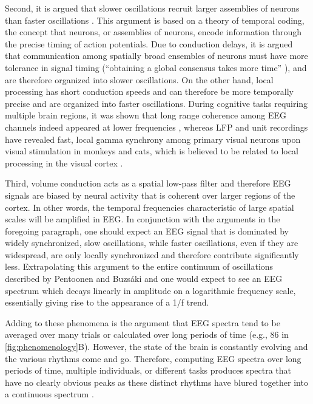 Second, it is argued that slower oscillations recruit larger assemblies of neurons than faster oscillations \cite{Buzsaki2006, Buzsaki2012c, Buzsaki2010}. This argument is based on a theory of temporal coding, the concept that neurons, or assemblies of neurons, encode information through the precise timing of action potentials. Due to conduction delays, it is argued that communication among spatially broad ensembles of neurons must have more tolerance in signal timing (``obtaining a global consensus takes more time'' \cite{Buzsaki2006}), and are therefore organized into slower oscillations. On the other hand, local processing has short conduction speeds and can therefore be more temporally precise and are organized into faster oscillations. During cognitive tasks requiring multiple brain regions, it was shown that long range coherence among EEG channels indeed appeared at lower frequencies \cite{Sarnthein1998,VonStein1999}, whereas LFP and unit recordings have revealed fast, local gamma synchrony among primary visual neurons upon visual stimulation in monkeys and cats, which is believed to be related to local processing in the visual cortex \cite{Gray1989,Eckhorn1994}.

Third, volume conduction acts as a spatial low-pass filter \cite{Nunez2006} and therefore EEG signals are biased by neural activity that is coherent over larger regions of the cortex. In other words, the temporal frequencies characteristic of large spatial scales will be amplified in EEG. In conjunction with the arguments in the foregoing paragraph, one should expect an EEG signal that is dominated by widely synchronized, slow oscillations, while faster oscillations, even if they are widespread, are only locally synchronized and therefore contribute significantly less. Extrapolating this argument to the entire continuum of oscillations described by Pentoonen and Buzsáki \cite{Penttonen2003} and one would expect to see an EEG spectrum which decays linearly in amplitude on a logarithmic frequency scale, essentially giving rise to the appearance of a 1/f trend.

Adding to these phenomena is the argument that EEG spectra tend to be averaged over many trials or calculated over long periods of time (e.g., \qty{86}{\min} in \autoref{fig:phenomenology}B). However, the state of the brain is constantly evolving and the various rhythms come and go. Therefore, computing EEG spectra over long periods of time, multiple individuals, or different tasks produces spectra that have no clearly obvious peaks as these distinct rhythms have blured together into a continuous spectrum \cite{Buzsaki2006}.

